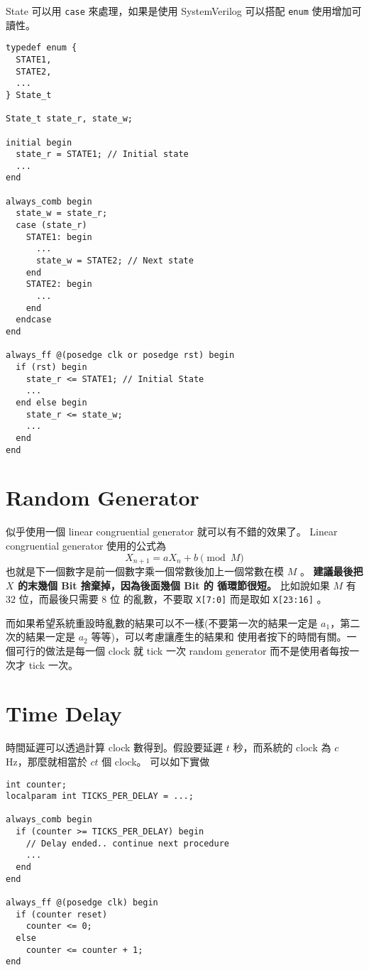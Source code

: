 \documentclass[12pt, a4paper]{article}
\begin{document}
State 可以用 \texttt{case} 來處理，如果是使用 SystemVerilog
可以搭配 \texttt{enum} 使用增加可讀性。
\begin{verbatim}
typedef enum {
  STATE1,
  STATE2,
  ...
} State_t

State_t state_r, state_w;

initial begin
  state_r = STATE1; // Initial state
  ...
end

always_comb begin
  state_w = state_r;
  case (state_r)
    STATE1: begin
      ...
      state_w = STATE2; // Next state
    end
    STATE2: begin
      ...
    end
  endcase
end

always_ff @(posedge clk or posedge rst) begin
  if (rst) begin
    state_r <= STATE1; // Initial State
    ...
  end else begin
    state_r <= state_w;
    ...
  end
end
\end{verbatim}

\section{Random Generator}
似乎使用一個 linear congruential generator 就可以有不錯的效果了。
Linear congruential generator 使用的公式為
\[ X_{n+1} = a X_n + b \pmod{M} \]
也就是下一個數字是前一個數字乘一個常數後加上一個常數在模 $M$ 。
{\bf 建議最後把 $X$ 的末幾個 Bit 捨棄掉，因為後面幾個 Bit 的
循環節很短。 } 比如說如果 $M$ 有 $32$ 位，而最後只需要 $8$ 位
的亂數，不要取 \texttt{X[7:0]} 而是取如 \texttt{X[23:16]} 。

而如果希望系統重設時亂數的結果可以不一樣(不要第一次的結果一定是
$a_1$，第二次的結果一定是 $a_2$ 等等)，可以考慮讓產生的結果和
使用者按下的時間有關。一個可行的做法是每一個 clock 就 tick 
一次 random generator 而不是使用者每按一次才 tick 一次。

\section{Time Delay}
時間延遲可以透過計算 clock 數得到。假設要延遲 $t$ 秒，而系統的
clock 為 $c$ Hz，那麼就相當於 $ct$ 個 clock。 可以如下實做 
\clearpage
\begin{verbatim}
int counter;
localparam int TICKS_PER_DELAY = ...;

always_comb begin
  if (counter >= TICKS_PER_DELAY) begin
    // Delay ended.. continue next procedure
    ...
  end
end

always_ff @(posedge clk) begin
  if (counter reset) 
    counter <= 0;
  else 
    counter <= counter + 1;
end
\end{verbatim}
\end{document}
